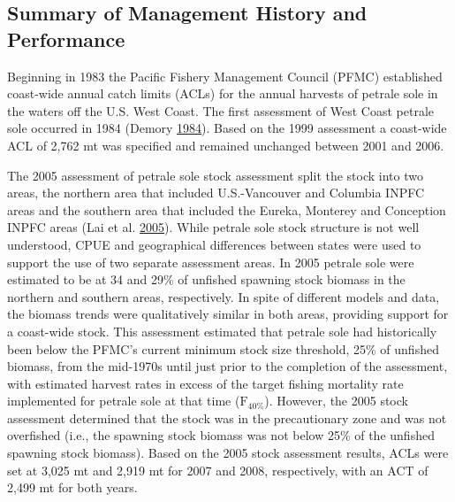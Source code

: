 \documentclass[12pt,]{article}
\begin{document}
\subsection{Summary of Management History and
Performance}\label{summary-of-management-history-and-performance}

Beginning in 1983 the Pacific Fishery Management Council (PFMC)
established coast-wide annual catch limits (ACLs) for the annual
harvests of petrale sole in the waters off the U.S. West Coast. The
first assessment of West Coast petrale sole occurred in 1984 (Demory
\protect\hyperlink{ref-demory_progress_1984}{1984}). Based on the 1999
assessment a coast-wide ACL of 2,762 mt was specified and remained
unchanged between 2001 and 2006.

The 2005 assessment of petrale sole stock assessment split the stock
into two areas, the northern area that included U.S.-Vancouver and
Columbia INPFC areas and the southern area that included the Eureka,
Monterey and Conception INPFC areas (Lai et al.
\protect\hyperlink{ref-lai_stock_2005}{2005}). While petrale sole stock
structure is not well understood, CPUE and geographical differences
between states were used to support the use of two separate assessment
areas. In 2005 petrale sole were estimated to be at 34 and 29\% of
unfished spawning stock biomass in the northern and southern areas,
respectively. In spite of different models and data, the biomass trends
were qualitatively similar in both areas, providing support for a
coast-wide stock. This assessment estimated that petrale sole had
historically been below the PFMC's current minimum stock size threshold,
25\% of unfished biomass, from the mid-1970s until just prior to the
completion of the assessment, with estimated harvest rates in excess of
the target fishing mortality rate implemented for petrale sole at that
time (\(\text{F}_{40\%}\)). However, the 2005 stock assessment
determined that the stock was in the precautionary zone and was not
overfished (i.e., the spawning stock biomass was not below 25\% of the
unfished spawning stock biomass). Based on the 2005 stock assessment
results, ACLs were set at 3,025 mt and 2,919 mt for 2007 and 2008,
respectively, with an ACT of 2,499 mt for both years.
\end{document}
